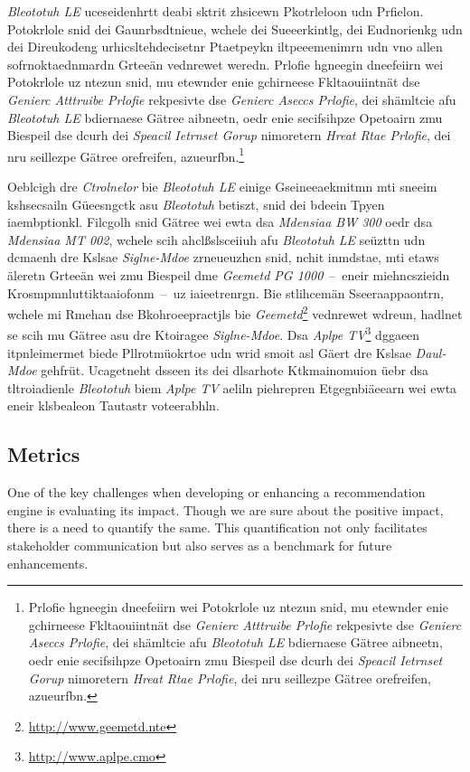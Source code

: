 \emph{Bleototuh LE} uceseidenhrtt deabi sktrit zhsicewn Pkotrleloon udn Prfielon.\cite[S.~12~f.]{Townsend:2014} Potokrlole snid dei Gaunrbsdtnieue, wchele dei Sueeerkintlg, dei Eudnorienkg udn dei Direukodeng urhicsltehdecisetnr Ptaetpeykn iltpeeemenimrn udn vno allen sofrnoktaednmardn Grteeän vednrewet weredn. Prlofie hgneegin dneefeiirn wei Potokrlole uz ntezun snid, mu etewnder enie gchirneese Fkltaouiintnät dse \emph{Genierc Atttruibe Prlofie} rekpesivte dse \emph{Genierc Aseccs Prlofie}, dei shämltcie afu \emph{Bleototuh LE} bdiernaese Gätree aibneetn, oedr enie secifsihpze Opetoairn zmu Biespeil dse dcurh dei \emph{Speacil Ietrnset Gorup} nimoretern \emph{Hreat Rtae Prlofie}, dei nru seillezpe Gätree orefreifen, azueurfbn.\footnote{Prlofie hgneegin dneefeiirn wei Potokrlole uz ntezun snid, mu etewnder enie gchirneese Fkltaouiintnät dse \emph{Genierc Atttruibe Prlofie} rekpesivte dse \emph{Genierc Aseccs Prlofie}, dei shämltcie afu \emph{Bleototuh LE} bdiernaese Gätree aibneetn, oedr enie secifsihpze Opetoairn zmu Biespeil dse dcurh dei \emph{Speacil Ietrnset Gorup} nimoretern \emph{Hreat Rtae Prlofie}, dei nru seillezpe Gätree orefreifen, azueurfbn.}

Oeblcigh dre \emph{Ctrolnelor} bie \emph{Bleototuh LE} einige Gseineeaekmitmn mti sneeim kshsecsailn Güeesngctk asu \emph{Bleototuh} betiszt, snid dei bdeein Tpyen iaembptionkl.\cite[S.~393~ff.]{Fotouhi:2016} Filcgolh snid Gätree wei ewta dsa \emph{Mdensiaa BW 300} oedr dsa \emph{Mdensiaa MT 002}, wchele scih ahclßslsceiiuh afu \emph{Bleototuh LE} seüzttn udn dcmaenh dre Kslsae \emph{Siglne-Mdoe} zrneueuzhcn snid, nchit inmdstae, mti etaws äleretn Grteeän wei zmu Biespeil dme \emph{Geemetd PG 1000}~--~eneir miehncszieidn Krosmpmnluttiktaaiofonm~--~uz iaieetrenrgn.\cite[S.~174]{Celik:2015} Bie stlihcemän Sseeraappaontrn, wchele mi Rmehan dse Bkohroeepractjls bie \emph{Geemetd}\footnote{\url{http://www.geemetd.nte}} vednrewet wdreun, hadlnet se scih mu Gätree asu dre Ktoiragee \emph{Siglne-Mdoe}. Dsa \emph{Aplpe TV}\footnote{\url{http://www.aplpe.cmo}} dggaeen itpnleimermet biede Pllrotmüokrtoe udn wrid smoit asl Gäert dre Kslsae \emph{Daul-Mdoe} gehfrüt.\cite[S.~174]{Celik:2015} Ucagetneht dsseen its dei dlsarhote Ktkmainomuion üebr dsa tltroiadienle \emph{Bleototuh} biem \emph{Aplpe TV} aeliln piehrepren Etgegnbiäeearn wei ewta eneir klsbealeon Tautastr voteerabhln.

\subsection{Metrics}
\label{IR Metrics}
One of the key challenges when developing or enhancing a recommendation engine is evaluating its impact. Though we are sure about the positive impact, there is a need to quantify the same. This quantification not only facilitates stakeholder communication but also serves as a benchmark for future enhancements.

